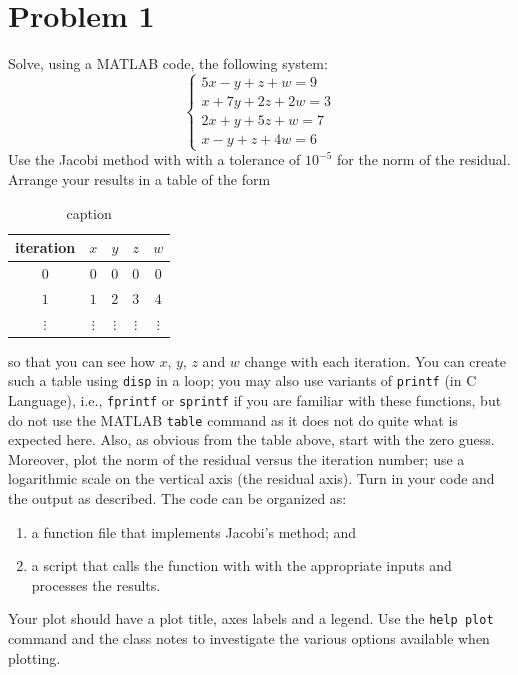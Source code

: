 \section{Problem 1}%
\label{sec:problem_1}
Solve, using a MATLAB code, the following system:
\begin{equation*}
  \begin{cases}
    5x - y + z + w   = 9 \\
    x + 7y + 2z + 2w = 3 \\
    2x + y + 5z + w  = 7 \\
    x - y + z + 4w   = 6
  \end{cases}
\end{equation*}
Use the Jacobi method with with a tolerance of $10^{-5}$ for the norm of the residual. Arrange your results in a table of the form
\begin{table}[!hbtp]
  \centering
  \caption{caption}
  \label{tab:label}
  \begin{tabular}{ccccc}
    \toprule
    iteration & $x$      & $y$      & $z$      & $w$      \\
    \midrule
    $0$       & $0$      & $0$      & $0$      & $0$      \\
    $1$       & $1$      & $2$      & $3$      & $4$      \\
    $\vdots$  & $\vdots$ & $\vdots$ & $\vdots$ & $\vdots$ \\
    \bottomrule
  \end{tabular}
\end{table}
so that you can see how $x$, $y$, $z$ and $w$ change with each iteration. You can create such a table using \verb|disp| in a loop; you may also use variants of \verb|printf| (in C Language), i.e., \verb|fprintf| or \verb|sprintf| if you are familiar with these functions, but do not use the MATLAB \verb|table| command as it does not do quite what is expected here. Also, as obvious from the table above, start with the zero guess. Moreover, plot the norm of the residual versus the iteration number; use a logarithmic scale on the vertical axis (the residual axis). Turn in your code and the output as described. The code can be organized as:
\begin{enumerate}
  \item a function file that implements Jacobi's method; and
  \item a script that calls the function with with the appropriate inputs and processes the results.\end{enumerate}
Your plot should have a plot title, axes labels and a legend. Use the \verb|help plot| command and the class notes  to investigate the various options  available when plotting.
